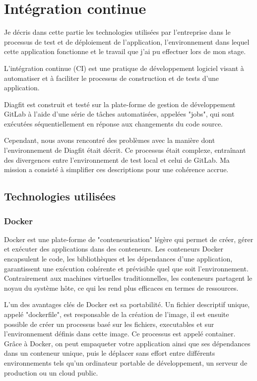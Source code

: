 \newpage
\section{Intégration continue}
Je décris dans cette partie les technologies utilisées par l'entreprise dans le processus de test et de déploiement de l'application, l'environnement dans lequel cette application fonctionne et le travail que j'ai pu effectuer lors de mon stage.

L'intégration continue (CI) est une pratique de développement logiciel visant à automatiser et à faciliter le processus de construction et de tests d'une application.

Diagfit est construit et testé sur la plate-forme de gestion de développement GitLab à l'aide d'une série de tâches automatisées, appelées "jobs", qui sont exécutées séquentiellement en réponse aux changements du code source.



Cependant, nous avons rencontré des problèmes avec la manière dont l'environnement de Diagfit était décrit.
Ce processus était complexe, entraînant des divergences entre l'environnement de test local et celui de GitLab.
Ma mission a consisté à simplifier ces descriptions pour une cohérence accrue.


\subsection{Technologies utilisées}
\subsubsection{Docker}
Docker est une plate-forme de "conteneurisation" légère qui permet de créer, gérer et exécuter des applications dans des conteneurs.
Les conteneurs Docker encapsulent le code, les bibliothèques et les dépendances d'une application, garantissent une exécution cohérente et prévisible quel que soit l'environnement.
Contrairement aux machines virtuelles traditionnelles, les conteneurs partagent le noyau du système hôte, ce qui les rend plus efficaces en termes de ressources.

L'un des avantages clés de Docker est sa portabilité.
Un fichier descriptif unique, appelé "dockerfile", est responsable de la création de l'image, il est ensuite possible de créer un processus basé sur les fichiers, executables et sur l'environnement définis dans cette image.
Ce processus est appelé container.
Grâce à Docker, on peut empaqueter votre application ainsi que ses dépendances dans un conteneur unique, puis le déplacer sans effort entre différents environnements tels qu'un ordinateur portable de développement, un serveur de production ou un cloud public.

